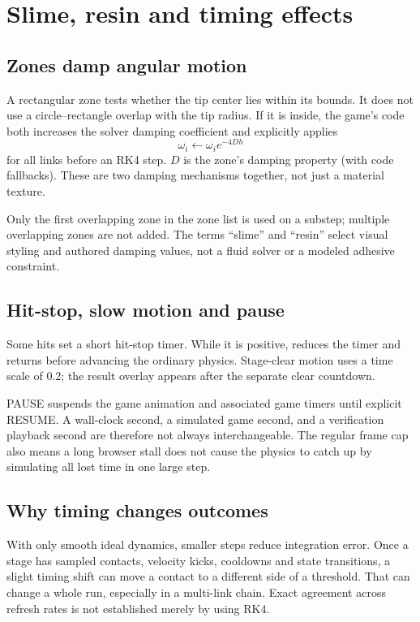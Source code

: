 \documentclass[11pt,a4paper]{article}
\newcommand{\code}[1]{\texttt{\detokenize{#1}}}
\begin{document}
\section{Slime, resin and timing effects}
\subsection{Zones damp angular motion}
A rectangular zone tests whether the tip center lies within its bounds. It does not use a circle--rectangle overlap with the tip radius. If it is inside, the game's code both increases the solver damping coefficient and explicitly applies
\[
 \omega_i\leftarrow\omega_i e^{-4Dh}
\]
for all links before an RK4 step. \(D\) is the zone's damping property (with code fallbacks). These are two damping mechanisms together, not just a material texture.

Only the first overlapping zone in the zone list is used on a substep; multiple overlapping zones are not added. The terms ``slime'' and ``resin'' select visual styling and authored damping values, not a fluid solver or a modeled adhesive constraint.
\subsection{Hit-stop, slow motion and pause}
Some hits set a short hit-stop timer. While it is positive, \code{update} reduces the timer and returns before advancing the ordinary physics. Stage-clear motion uses a time scale of 0.2; the result overlay appears after the separate clear countdown.

PAUSE suspends the game animation and associated game timers until explicit RESUME. A wall-clock second, a simulated game second, and a verification playback second are therefore not always interchangeable. The regular frame cap also means a long browser stall does not cause the physics to catch up by simulating all lost time in one large step.
\subsection{Why timing changes outcomes}
With only smooth ideal dynamics, smaller steps reduce integration error. Once a stage has sampled contacts, velocity kicks, cooldowns and state transitions, a slight timing shift can move a contact to a different side of a threshold. That can change a whole run, especially in a multi-link chain. Exact agreement across refresh rates is not established merely by using RK4.
\end{document}
